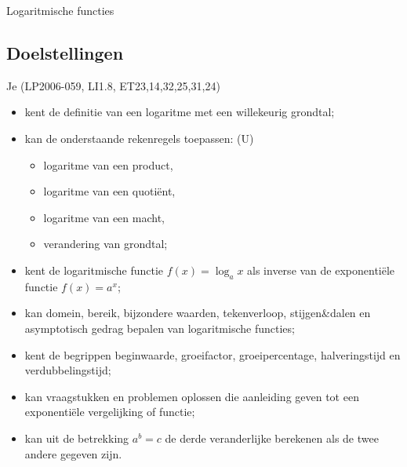 \documentclass[12pt,twoside,a4paper]{article}
\begin{document}
\begin{center}
  \begin{mdframed}
  \centering
  \fontsize{40}{60}\selectfont Logaritmische functies
  \end{mdframed}
  \vfill
  \vfill
\end{center}

\subsection*{Doelstellingen}
\vspace*{-0.8cm}
{\singlespacing
Je \hfill  {\scriptsize(LP2006-059, LI1.8, ET23,14,32,25,31,24)}
\begin{itemize}
  \itemsep-0.2em
  \item kent de definitie van een logaritme met een willekeurig grondtal;
  \item kan de onderstaande rekenregels toepassen: (U)
  \begin{itemize}
    \item logaritme van een product,
    \item logaritme van een quotiënt,
    \item logaritme van een macht,
    \item verandering van grondtal;
  \end{itemize}
  \item kent de logaritmische functie $f( x ) = \log_a x$ als inverse van de exponentiële functie $f( x ) = a^x$;
  \item kan domein, bereik, bijzondere waarden, tekenverloop, stijgen\&dalen en asymptotisch gedrag bepalen van logaritmische functies;
  \item kent de begrippen beginwaarde, groeifactor, groeipercentage, halveringstijd en verdubbelingstijd;
  \item kan vraagstukken en problemen oplossen die aanleiding geven tot een exponentiële vergelijking of functie;
  \item kan uit de betrekking $a^b = c$ de derde veranderlijke berekenen als de twee andere gegeven zijn.
\end{itemize}}
\end{document}
